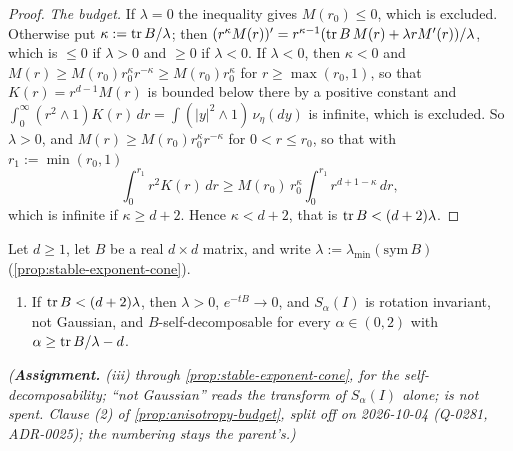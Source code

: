 \begin{proof}
\emph{The budget.} If $\lambda = 0$ the inequality gives $M(r_0) \le 0$, which is excluded. Otherwise
put $\kappa := \operatorname{tr} B/\lambda$; then $(r^\kappa M(r))' = r^{\kappa-1}(\operatorname{tr} B\,M(r) + \lambda rM'(r))/\lambda$,
which is $\le 0$ if $\lambda > 0$ and $\ge 0$ if $\lambda < 0$. If $\lambda < 0$, then $\kappa < 0$ and
$M(r) \ge M(r_0)r_0^\kappa r^{-\kappa} \ge M(r_0)r_0^\kappa$ for $r \ge \max(r_0, 1)$, so that
$K(r) = r^{d-1}M(r)$ is bounded below there by a positive constant and
$\int_0^\infty(r^2 \wedge 1)K(r)\,dr = \int(|y|^2 \wedge 1)\,\nu_\eta(dy)$ is infinite, which is excluded.
So $\lambda > 0$, and $M(r) \ge M(r_0)r_0^\kappa r^{-\kappa}$ for $0 < r \le r_0$, so that with
$r_1 := \min(r_0, 1)$
\[
  \int_0^{r_1}r^2K(r)\,dr \ge M(r_0)\,r_0^\kappa\int_0^{r_1}r^{d+1-\kappa}\,dr ,
\]
which is infinite if $\kappa \ge d+2$. Hence $\kappa < d + 2$, that is $\operatorname{tr} B < (d+2)\lambda$.
\end{proof}

\begin{proposition}
\label{prop:anisotropy-budget-converse}
\leanok
Let $d \ge 1$, let $B$ be a real $d \times d$ matrix, and write
$\lambda := \lambda_{\min}(\mathrm{sym}\,B)$ (\ref{prop:stable-exponent-cone}).
\begin{enumerate}
\item[(2)] If $\operatorname{tr} B < (d+2)\lambda$, then $\lambda > 0$, $e^{-tB} \to 0$, and $S_\alpha(I)$ is
rotation invariant, not Gaussian, and $B$-self-decomposable for every $\alpha \in (0,2)$ with
$\alpha \ge \operatorname{tr} B/\lambda - d$.
\end{enumerate}
\statusA\quad{}\quad\emph{(\textbf{Assignment.} (iii) through
\ref{prop:stable-exponent-cone}, for the self-decomposability; ``not Gaussian'' reads the transform of
$S_\alpha(I)$ alone;  is not spent. Clause (2) of \ref{prop:anisotropy-budget},
split off on 2026-10-04 (Q-0281, ADR-0025); the numbering stays the parent's.)}
\end{proposition}

